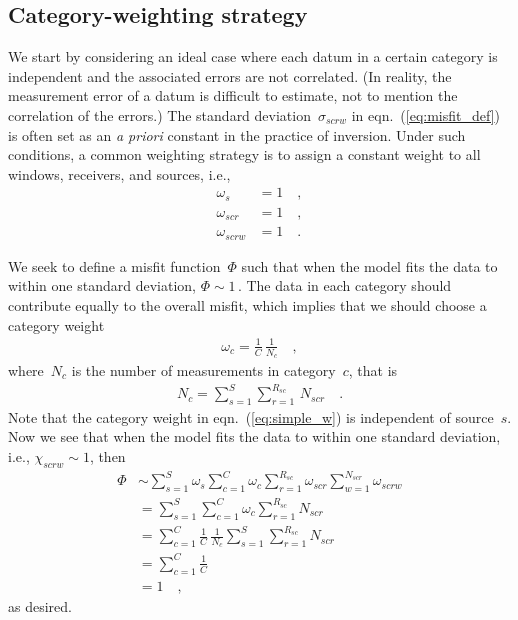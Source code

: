 \subsection{Category-weighting strategy}
\label{sec:simple}

We start by considering an ideal case where each datum in a certain category is independent and the 
associated errors are not correlated.  (In reality, the measurement error
of a datum is difficult to estimate, not to mention the correlation of the errors.) 
The standard deviation~$\sigma_{scrw}$ in eqn.~(\ref{eq:misfit_def}) is often 
set as an {\it a priori} constant in the practice of inversion.
Under such conditions, a common weighting strategy is to assign a constant 
weight to all windows, receivers, and sources, i.e.,
\begin{align}
\omega_{s} & =  1 \quad, \\
\omega_{scr} & = 1 \quad, \\
\omega_{scrw} & = 1 \quad.
\end{align}

We seek to define a misfit function~$\Phi$ such that when the model fits the data 
to within one standard deviation, $\Phi\sim 1$\,. The data in each category  
should contribute equally to the overall misfit,  which implies that we should choose a category weight
\begin{align}
\label{eq:simple_w}
\omega_{c} = \frac{1}{C}\,\frac{1}{N_c}
\quad,
\end{align}
where~$N_c$ is the number of measurements in category~$c$, that is
\begin{align}
\label{eq:Nc}
N_c=\sum_{s=1}^{S}\sum_{r=1}^{R_{sc}} \,N_{scr}
\quad .
\end{align}
Note that the category weight in eqn.~(\ref{eq:simple_w}) is independent of source~$s$.
Now we see that when the model fits the data to within one standard deviation, 
i.e., $\chi_{scrw} \sim 1$, then
\begin{align}
\Phi & \sim \sum_{s=1}^{S} \omega_s \sum_{c=1}^{C} \omega_{c} \sum_{r=1}^{R_{sc}} \omega_{scr} \sum_{w=1}^{N_{scr}} \omega_{scrw} \\
& = \sum_{s=1}^{S} \sum_{c=1}^{C} \omega_{c} \sum_{r=1}^{R_{sc}} N_{scr} \\
& = \sum_{c=1}^{C} \frac{1}{C}\,\frac{1}{N_c} \sum_{s=1}^{S} \sum_{r=1}^{R_{sc}} N_{scr} \\
& = \sum_{c=1}^{C} \frac{1}{C} \\
& = 1
\quad ,
\end{align}
as desired.

